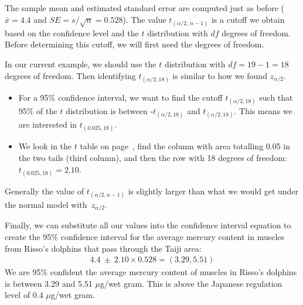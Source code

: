 The sample mean and estimated standard error are computed just as before ($\bar{x} = 4.4$ and $SE = s/\sqrt{n} = 0.528$). The value $t_{(\alpha/2, \, n-1)}$ is a cutoff we obtain based on the confidence level and the $t$ distribution with $df$ degrees of freedom. Before determining this cutoff, we will first need the degrees of freedom.


In our current example, we should use the $t$ distribution with $df=19-1=18$ degrees of freedom. Then identifying $t_{(\alpha/2, 18)}$ is similar to how we found $z_{\alpha/2}$.
\begin{itemize}
\setlength{\itemsep}{0mm}
\item For a 95\% confidence interval, we want to find the cutoff $t_{(\alpha/2, 18)}$ such that 95\% of the $t$ distribution is between -$t_{(\alpha/2, 18)}$ and $t_{(\alpha/2, 18)}$.
This means we are interested in $t_{(0.025, 18)}$.
\item We look in the $t$ table on page~\pageref{tTableSample}, find the column with area totalling 0.05 in the two tails (third column), and then the row with 18 degrees of freedom: $t_{(0.025, 18)} = 2.10$.
\end{itemize}
Generally the value of $t_{(\alpha/2, n-1)}$ is slightly larger than what we would get under the normal model with~$z_{\alpha/2}$.



Finally, we can substitute all our values into the confidence interval equation to create the 95\% confidence interval for the average mercury content in muscles from Risso's dolphins that pass through the Taiji area:
\begin{eqnarray*}
4.4 \ \pm\  2.10 \times 0.528	 = 	(3.29, 5.51)
\end{eqnarray*}
We are 95\% confident the average mercury content of muscles in Risso's dolphins is between 3.29 and 5.51 $\mu$g/wet gram. This is above the Japanese regulation level of 0.4 $\mu$g/wet gram.


